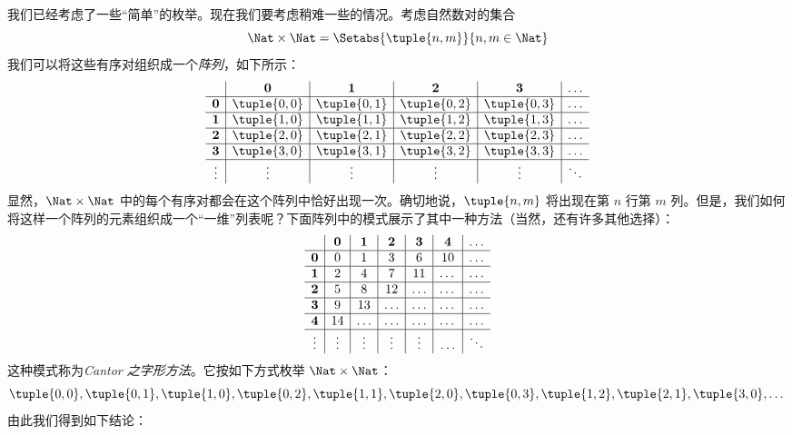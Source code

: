 \documentclass[../../../include/open-logic-section]{subfiles}
\begin{document}


\begin{explain}
我们已经考虑了一些“简单”的枚举。现在我们要考虑稍难一些的情况。考虑自然数对的集合
\[
\Nat \times \Nat = \Setabs{\tuple{n,m}}{n,m \in \Nat}
\]
我们可以将这些有序对组织成一个\emph{阵列}，如下所示：
\[
\begin{array}{ c | c | c | c | c | c}
& \mathbf 0 & \mathbf 1 & \mathbf 2 & \mathbf 3 & \dots \\
\hline
\mathbf 0 & \tuple{0,0} & \tuple{0,1} & \tuple{0,2} & \tuple{0,3} & \dots \\
\hline
\mathbf 1 & \tuple{1,0} & \tuple{1,1} & \tuple{1,2} & \tuple{1,3} & \dots \\
\hline
\mathbf 2 & \tuple{2,0} & \tuple{2,1} & \tuple{2,2} & \tuple{2,3} & \dots \\
\hline
\mathbf 3 & \tuple{3,0} & \tuple{3,1} & \tuple{3,2} & \tuple{3,3} & \dots \\
\hline
\vdots & \vdots & \vdots & \vdots & \vdots & \ddots\\
\end{array}
\]
显然，$\Nat \times \Nat$ 中的每个有序对都会在这个阵列中恰好出现一次。确切地说，$\tuple{n,m}$ 将出现在第 $n$ 行第 $m$ 列。但是，我们如何将这样一个阵列的元素组织成一个“一维”列表呢？下面阵列中的模式展示了其中一种方法（当然，还有许多其他选择）：
\[
\begin{array}{ c | c | c | c | c | c | c}
& \mathbf 0 & \mathbf 1 & \mathbf 2 & \mathbf 3 & \mathbf 4 &\dots \\
\hline
\mathbf 0 & 0  & 1& 3 & 6& 10 &\ldots \\
\hline
\mathbf 1 &2 & 4& 7 & 11 & \dots &\ldots \\
\hline
\mathbf 2 & 5 & 8 & 12 & \ldots & \dots&\ldots \\
\hline
\mathbf 3 & 9 & 13 & \ldots & \ldots & \dots & \ldots \\
\hline
\mathbf 4 & 14 & \ldots & \ldots & \ldots & \dots & \ldots \\
\hline
\vdots & \vdots & \vdots & \vdots & \vdots&\ldots & \ddots\\
\end{array}
\]\noindent
这种模式称为\emph{Cantor 之字形方法}。它按如下方式枚举 $\Nat \times \Nat$：
\[
\tuple{0,0}, \tuple{0,1}, \tuple{1,0}, \tuple{0,2}, \tuple{1,1},
\tuple{2,0}, \tuple{0,3}, \tuple{1,2}, \tuple{2,1}, \tuple{3,0}, \dots
\]
由此我们得到如下结论：
\end{explain}
\end{document}
